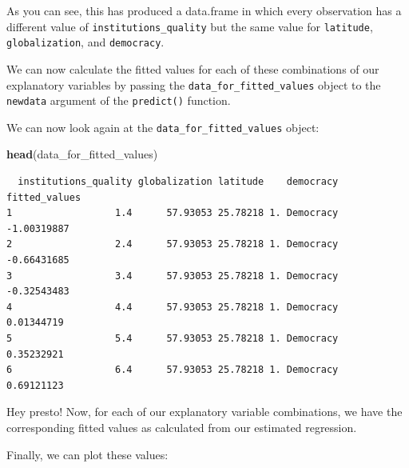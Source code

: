 \documentclass[]{article}
\newenvironment{Shaded}{\begin{snugshade}}{\end{snugshade}}
\newcommand{\KeywordTok}[1]{\textcolor[rgb]{0.13,0.29,0.53}{\textbf{#1}}}
\newcommand{\DataTypeTok}[1]{\textcolor[rgb]{0.13,0.29,0.53}{#1}}
\newcommand{\StringTok}[1]{\textcolor[rgb]{0.31,0.60,0.02}{#1}}
\newcommand{\CommentTok}[1]{\textcolor[rgb]{0.56,0.35,0.01}{\textit{#1}}}
\newcommand{\OperatorTok}[1]{\textcolor[rgb]{0.81,0.36,0.00}{\textbf{#1}}}
\newcommand{\NormalTok}[1]{#1}
\theoremstyle{definition}
\theoremstyle{definition}
\theoremstyle{definition}
\theoremstyle{remark}
\begin{document}
As you can see, this has produced a data.frame in which every
observation has a different value of \texttt{institutions\_quality} but
the same value for \texttt{latitude}, \texttt{globalization}, and
\texttt{democracy}.

We can now calculate the fitted values for each of these combinations of
our explanatory variables by passing the
\texttt{data\_for\_fitted\_values} object to the \texttt{newdata}
argument of the \texttt{predict()} function.

\begin{Shaded}
\end{Shaded}

We can now look again at the \texttt{data\_for\_fitted\_values} object:

\begin{Shaded}
\begin{Highlighting}[]
\KeywordTok{head}\NormalTok{(data_for_fitted_values)}
\end{Highlighting}
\end{Shaded}

\begin{verbatim}
  institutions_quality globalization latitude    democracy fitted_values
1                  1.4      57.93053 25.78218 1. Democracy   -1.00319887
2                  2.4      57.93053 25.78218 1. Democracy   -0.66431685
3                  3.4      57.93053 25.78218 1. Democracy   -0.32543483
4                  4.4      57.93053 25.78218 1. Democracy    0.01344719
5                  5.4      57.93053 25.78218 1. Democracy    0.35232921
6                  6.4      57.93053 25.78218 1. Democracy    0.69121123
\end{verbatim}

Hey presto! Now, for each of our explanatory variable combinations, we
have the corresponding fitted values as calculated from our estimated
regression.

Finally, we can plot these values:
\end{document}
